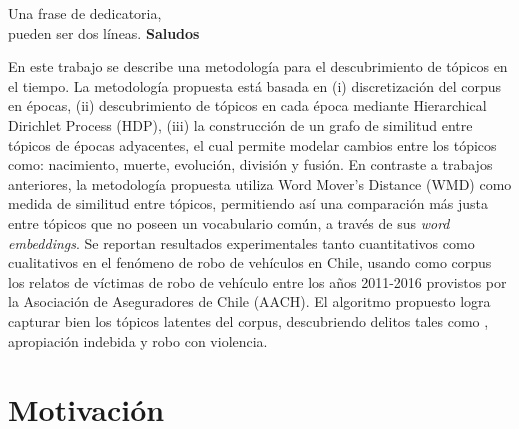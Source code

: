 \documentclass[letterpaper,12pt,oneside]{book} %
\begin{document}



\begin{dedicatoria}
	Una frase de dedicatoria, \\
	pueden ser dos líneas. \newp
	\textbf{Saludos}
\end{dedicatoria}

\begin{agradecimientos}
\end{agradecimientos}



\begin{resumen}
    En este trabajo se describe una metodología para el descubrimiento de tópicos en el tiempo. La metodología propuesta está basada en (i) discretización del corpus en épocas, (ii) descubrimiento de tópicos en cada época mediante Hierarchical Dirichlet Process (HDP), (iii) la construcción de un grafo de similitud entre tópicos de épocas adyacentes, el cual permite modelar cambios entre los tópicos como: nacimiento, muerte, evolución, división y fusión. En contraste a trabajos anteriores, la metodología propuesta utiliza Word Mover's Distance (WMD) como medida de similitud entre tópicos, permitiendo así una comparación más justa entre tópicos que no poseen un vocabulario común, a través de sus \textit{word embeddings}. Se reportan resultados experimentales tanto cuantitativos como cualitativos en el fenómeno de robo de vehículos en Chile, usando como corpus los relatos de víctimas de robo de vehículo entre los años 2011-2016 provistos por la Asociación de Aseguradores de Chile (AACH). El algoritmo propuesto logra capturar bien los tópicos latentes del corpus, descubriendo delitos tales como , apropiación indebida y robo con violencia.
\end{resumen}


\hypersetup{
    citecolor=Blue
}

\listoftodos
\chapter{Motivación}
\end{document}
